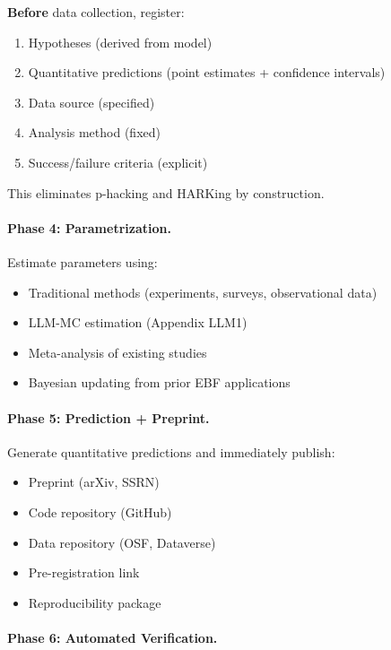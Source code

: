 \textbf{Before} data collection, register:
\begin{enumerate}[nosep]
    \item Hypotheses (derived from model)
    \item Quantitative predictions (point estimates + confidence intervals)
    \item Data source (specified)
    \item Analysis method (fixed)
    \item Success/failure criteria (explicit)
\end{enumerate}

This eliminates p-hacking and HARKing by construction.

\paragraph{Phase 4: Parametrization.}

Estimate parameters using:
\begin{itemize}[nosep]
    \item Traditional methods (experiments, surveys, observational data)
    \item LLM-MC estimation (Appendix LLM1)
    \item Meta-analysis of existing studies
    \item Bayesian updating from prior EBF applications
\end{itemize}

\paragraph{Phase 5: Prediction + Preprint.}

Generate quantitative predictions and immediately publish:
\begin{itemize}[nosep]
    \item Preprint (arXiv, SSRN)
    \item Code repository (GitHub)
    \item Data repository (OSF, Dataverse)
    \item Pre-registration link
    \item Reproducibility package
\end{itemize}

\paragraph{Phase 6: Automated Verification.}


